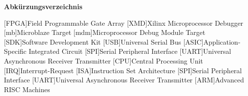 
{\textbf{Abkürzungsverzeichnis}}

\begin{acronym}[Bash]
 [FPGA]{Field Programmable Gate Array}
 [XMD]{Xilinx Microprocessor Debugger}
 [mb]{Microblaze Target}
 [mdm]{Microprocessor Debug Module Target}
 [SDK]{Software Development Kit}
 [USB]{Universal Serial Bus}
 [ASIC]{Application-Specific Integrated Circuit}
 [SPI]{Serial Peripheral Interface}
 [UART]{Universal Asynchronous Receiver Transmitter}
 [CPU]{Central Processing Unit}
 [IRQ]{Interrupt-Request}
 [ISA]{Instruction Set Architecture}
 [SPI]{Serial Peripheral Interface}
 [UART]{Universal Asynchronous Receiver Transmitter}
 [ARM]{Advanced RISC Machines}
\end{acronym}
